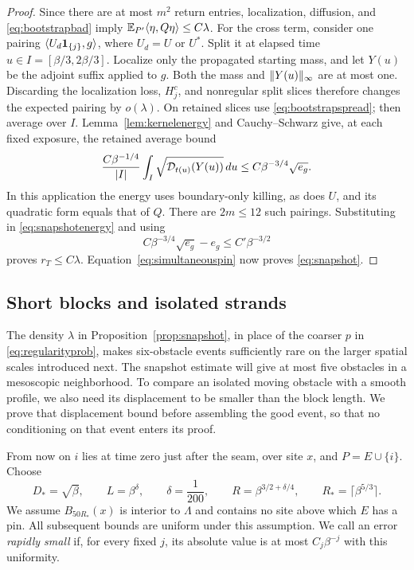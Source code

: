 \begin{proof}
Since there are at most $m^2$ return entries, localization, diffusion,
and \eqref{eq:bootstrapbad} imply
$\mathbb E_{P'}\langle \eta,Q\eta\rangle\le C\lambda$.
For the cross term, consider one pairing $\langle U_d\mathbf 1_{\{j\}},g\rangle$,
where $U_d=U$ or $U^*$.  Split it at elapsed time
$u\in I=[\beta/3,2\beta/3]$.  Localize only the propagated starting
mass, and let $Y(u)$ be the adjoint suffix applied to $g$.
Both the mass and $\lVert Y(u)\rVert_\infty$ are at most one.
Discarding the localization loss, $H_j^c$, and nonregular split slices
therefore changes the expected pairing by $o(\lambda)$.
On retained slices use \eqref{eq:bootstrapspread}; then average over
$I$.  Lemma~\ref{lem:kernelenergy} and Cauchy--Schwarz give, at each
fixed exposure, the retained average bound
\[
 \frac{C\beta^{-1/4}}{|I|}
         \int_I\sqrt{\mathcal D_{t(u)}(Y(u))}\,du
       \le C\beta^{-3/4}\sqrt{e_g}.
\]
In this application the energy uses boundary-only killing, as does
$U$, and its quadratic form equals that of $Q$.
There are $2m\le12$ such pairings.  Substituting in
\eqref{eq:snapshotenergy} and using
\[
 C\beta^{-3/4}\sqrt{e_g}-e_g\le C'\beta^{-3/2}
\]
proves $r_T\le C\lambda$.  Equation~\eqref{eq:simultaneouspin}
now proves \eqref{eq:snapshot}.
\end{proof}

\subsection{Short blocks and isolated strands}

The density $\lambda$ in Proposition~\ref{prop:snapshot}, in place of
the coarser $p$ in \eqref{eq:regularityprob}, makes six-obstacle events
sufficiently rare on the larger spatial scales introduced next.
The snapshot estimate will give at most five obstacles in a mesoscopic
neighborhood.  To compare an isolated moving obstacle with a smooth
profile, we also need its displacement to be smaller than the block
length.  We prove that displacement bound before assembling the good
event, so that no conditioning on that event enters its proof.

From now on $i$ lies at time zero just after the seam, over site $x$,
and $P=E\cup\{i\}$.  Choose
\begin{equation}\label{eq:scales}
 D_*=\sqrt\beta,\qquad L=\beta^\delta,\qquad\delta=\frac1{200},
 \qquad R=\beta^{3/2+\delta/4},\qquad
 R_*=\lceil\beta^{5/3}\rceil.
\end{equation}
We assume $B_{50R_*}(x)$ is interior to $\Lambda$ and contains no site
above which $E$ has a pin.  All subsequent bounds are uniform under this
assumption.  We call an error \emph{rapidly small} if, for every fixed
$j$, its absolute value is at most $C_j\beta^{-j}$ with this uniformity.

